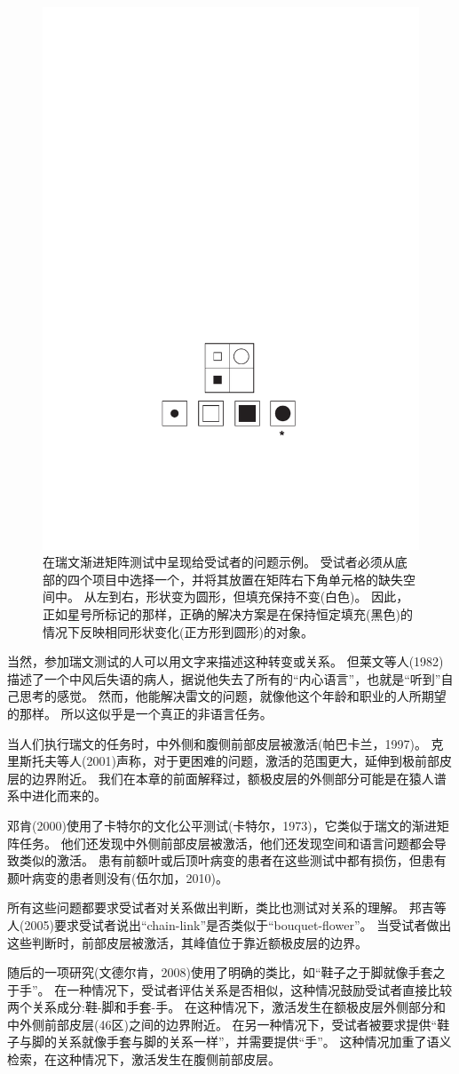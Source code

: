 \begin{figure}[!htb]
	\centering
	\includegraphics[width=0.5\linewidth]{chap9/9_8}
	\caption{在瑞文渐进矩阵测试中呈现给受试者的问题示例。
		受试者必须从底部的四个项目中选择一个，并将其放置在矩阵右下角单元格的缺失空间中。
		从左到右，形状变为圆形，但填充保持不变(白色)。
		因此，正如星号所标记的那样，正确的解决方案是在保持恒定填充(黑色)的情况下反映相同形状变化(正方形到圆形)的对象\cite{duncan2010intelligence}。\label{fig:fig_9_8}}
\end{figure}


当然，参加瑞文测试的人可以用文字来描述这种转变或关系。
但莱文等人(1982)描述了一个中风后失语的病人，据说他失去了所有的“内心语言”，也就是“听到”自己思考的感觉。
然而，他能解决雷文的问题，就像他这个年龄和职业的人所期望的那样。
所以这似乎是一个真正的非语言任务。


当人们执行瑞文的任务时，中外侧和腹侧前部皮层被激活(帕巴卡兰，1997)。
克里斯托夫等人(2001)声称，对于更困难的问题，激活的范围更大，延伸到极前部皮层的边界附近。
我们在本章的前面解释过，额极皮层的外侧部分可能是在猿人谱系中进化而来的。


邓肯(2000)使用了卡特尔的文化公平测试(卡特尔，1973)，它类似于瑞文的渐进矩阵任务。
他们还发现中外侧前部皮层被激活，他们还发现空间和语言问题都会导致类似的激活。
患有前额叶或后顶叶病变的患者在这些测试中都有损伤，但患有颞叶病变的患者则没有(伍尔加，2010)。


所有这些问题都要求受试者对关系做出判断，类比也测试对关系的理解。
邦吉等人(2005)要求受试者说出“chain-link”是否类似于“bouquet-flower”。
当受试者做出这些判断时，前部皮层被激活，其峰值位于靠近额极皮层的边界。


随后的一项研究(文德尔肯，2008)使用了明确的类比，如“鞋子之于脚就像手套之于手”。
在一种情况下，受试者评估关系是否相似，这种情况鼓励受试者直接比较两个关系成分:鞋-脚和手套-手。
在这种情况下，激活发生在额极皮层外侧部分和中外侧前部皮层(46区)之间的边界附近。
在另一种情况下，受试者被要求提供“鞋子与脚的关系就像手套与脚的关系一样”，并需要提供“手”。
这种情况加重了语义检索，在这种情况下，激活发生在腹侧前部皮层。


